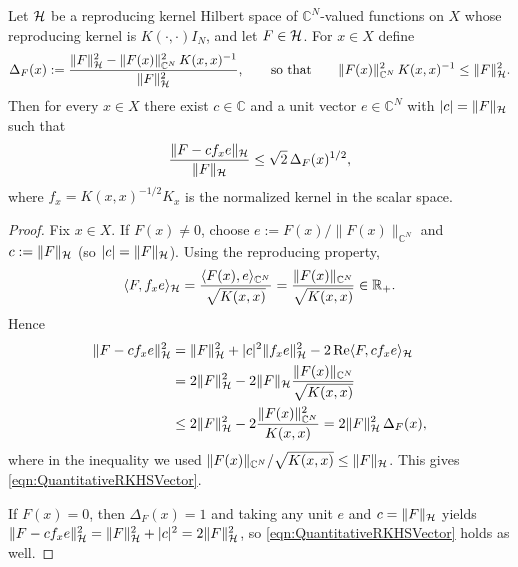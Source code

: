 \documentclass[a4paper,10pt]{amsart}
\begin{document}


\begin{numlemma}\label{lemma:RKHSQuantitativeVector}
Let $\mathcal{H}$ be a reproducing kernel Hilbert space of $\mathbb{C}^N$-valued functions on $X$
whose reproducing kernel is $K(\cdot,\cdot)I_N$, and let $F\in \mathcal{H}$.
For $x\in X$ define
\[
\Delta_F(x):=\frac{\|F\|_{\mathcal{H}}^2-\|F(x)\|_{\mathbb{C}^N}^2\,K(x,x)^{-1}}{\|F\|_{\mathcal{H}}^2},
\qquad\text{so that}\qquad
\|F(x)\|_{\mathbb{C}^N}^2\,K(x,x)^{-1}\le \|F\|_{\mathcal{H}}^2 .
\]
Then for every $x\in X$ there exist $c\in\mathbb{C}$ and a unit vector $e\in\mathbb{C}^N$ with
$|c|=\|F\|_{\mathcal{H}}$ such that
\begin{equation}\label{eqn:QuantitativeRKHSVector}
\frac{\|F-c f_x e\|_{\mathcal{H}}}{\|F\|_{\mathcal{H}}}
\le \sqrt2\,\Delta_F(x)^{1/2},
\end{equation}
where $f_x = K(x,x)^{-1/2}K_x$ is the normalized kernel in the scalar space.
\end{numlemma}

\begin{proof}
Fix $x\in X$. If $F(x)\neq 0$, choose $e:=F(x)/\|F(x)\|_{\mathbb{C}^N}$ and
$c:=\|F\|_{\mathcal{H}}$ (so $|c|=\|F\|_{\mathcal{H}}$). Using the reproducing property,
\[
\langle F, f_x e\rangle_{\mathcal{H}}
=\frac{\langle F(x),e\rangle_{\mathbb{C}^N}}{\sqrt{K(x,x)}}
=\frac{\|F(x)\|_{\mathbb{C}^N}}{\sqrt{K(x,x)}}\in\mathbb{R}_+ .
\]
Hence
\begin{align*}
\|F-c f_x e\|_{\mathcal{H}}^2
&=\|F\|_{\mathcal{H}}^2+|c|^2\|f_x e\|_{\mathcal{H}}^2-2\operatorname{Re}\langle F, c f_x e\rangle_{\mathcal{H}}\\
&=2\|F\|_{\mathcal{H}}^2-2\|F\|_{\mathcal{H}}\frac{\|F(x)\|_{\mathbb{C}^N}}{\sqrt{K(x,x)}}\\
&\le 2\|F\|_{\mathcal{H}}^2-2\frac{\|F(x)\|_{\mathbb{C}^N}^2}{K(x,x)}
=2\|F\|_{\mathcal{H}}^2\,\Delta_F(x),
\end{align*}
where in the inequality we used $\|F(x)\|_{\mathbb{C}^N}/\sqrt{K(x,x)}\le \|F\|_{\mathcal{H}}$.
This gives \eqref{eqn:QuantitativeRKHSVector}.

If $F(x)=0$, then $\Delta_F(x)=1$ and taking any unit $e$ and $c=\|F\|_{\mathcal{H}}$
yields $\|F-c f_x e\|_{\mathcal{H}}^2=\|F\|_{\mathcal{H}}^2+|c|^2=2\|F\|_{\mathcal{H}}^2$,
so \eqref{eqn:QuantitativeRKHSVector} holds as well.
\end{proof}
\end{document}
